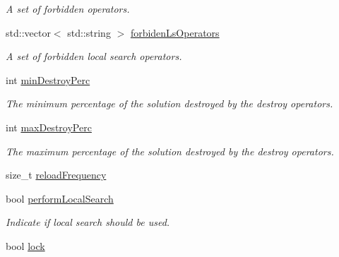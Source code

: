 \begin{DoxyCompactItemize}
\begin{DoxyCompactList}\small\item\em A set of forbidden operators. \end{DoxyCompactList}\item 
\hypertarget{classALNS__Parameters_a36fe0d0580b803658a662d3b82219a81}{std\-::vector$<$ std\-::string $>$ \hyperlink{classALNS__Parameters_a36fe0d0580b803658a662d3b82219a81}{forbiden\-Ls\-Operators}}\label{classALNS__Parameters_a36fe0d0580b803658a662d3b82219a81}

\begin{DoxyCompactList}\small\item\em A set of forbidden local search operators. \end{DoxyCompactList}\item 
\hypertarget{classALNS__Parameters_ad381c03ffab6cb18f54662e13e0d7e99}{int \hyperlink{classALNS__Parameters_ad381c03ffab6cb18f54662e13e0d7e99}{min\-Destroy\-Perc}}\label{classALNS__Parameters_ad381c03ffab6cb18f54662e13e0d7e99}

\begin{DoxyCompactList}\small\item\em The minimum percentage of the solution destroyed by the destroy operators. \end{DoxyCompactList}\item 
\hypertarget{classALNS__Parameters_ac86b58f688b29ede61f948bf3b11828d}{int \hyperlink{classALNS__Parameters_ac86b58f688b29ede61f948bf3b11828d}{max\-Destroy\-Perc}}\label{classALNS__Parameters_ac86b58f688b29ede61f948bf3b11828d}

\begin{DoxyCompactList}\small\item\em The maximum percentage of the solution destroyed by the destroy operators. \end{DoxyCompactList}\item 
size\-\_\-t \hyperlink{classALNS__Parameters_ab3c514956945f29a6dff9a77fd5cb3ea}{reload\-Frequency}
\item 
\hypertarget{classALNS__Parameters_a6b65081dc41bf2657da46ad28f4a9b23}{bool \hyperlink{classALNS__Parameters_a6b65081dc41bf2657da46ad28f4a9b23}{perform\-Local\-Search}}\label{classALNS__Parameters_a6b65081dc41bf2657da46ad28f4a9b23}

\begin{DoxyCompactList}\small\item\em Indicate if local search should be used. \end{DoxyCompactList}\item 
bool \hyperlink{classALNS__Parameters_adda245fa6198a0d2875764fb4a8d0cde}{lock}
\end{DoxyCompactItemize}


